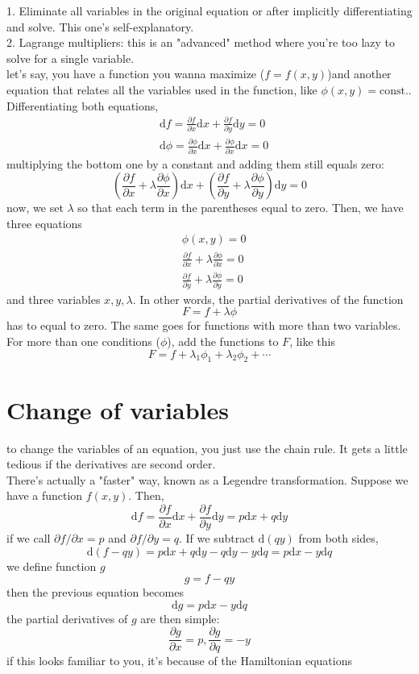 \documentclass[oneside]{book}
\numberwithin{equation}{chapter} %
\begin{document}
1. Eliminate all variables in the original equation or after implicitly differentiating and solve. This one's self-explanatory. \\

2. Lagrange multipliers: this is an "advanced" method where you're too lazy to solve for a single variable. \\
let's say, you have a function you wanna maximize ($f=f(x,y)$)and another equation that relates all the variables used in the function, like $\phi(x,y)=\text{const.}$. Differentiating both equations, 
\begin{align*}
	&\mathrm df=\frac{\partial f}{\partial x}\mathrm dx+\frac{\partial f}{\partial y}\mathrm dy=0\\
	&\mathrm d\phi=\frac{\partial\phi }{\partial x}\mathrm dx+\frac{\partial \phi}{\partial x}\mathrm dx=0
\end{align*}
multiplying the bottom one by a constant and adding them still equals zero:
$$
\left(\frac{\partial f}{\partial x}+\lambda \frac{\partial\phi }{\partial x}\right)\mathrm dx+\left(\frac{\partial f}{\partial y}+\lambda \frac{\partial\phi }{\partial y}\right)\mathrm dy=0
$$
now, we set $\lambda$ so that each term in the parentheses equal to zero. Then, we have three equations 
\begin{align*}
	&\phi(x,y)=0\\
	&\frac{\partial f}{\partial x}+\lambda \frac{\partial\phi }{\partial x}=0\\
	&\frac{\partial f}{\partial y}+\lambda \frac{\partial\phi }{\partial y}=0
\end{align*}
and three variables $x,y,\lambda$. In other words, the partial derivatives of the function 
$$F=f+\lambda\phi$$
has to equal to zero. The same goes for functions with more than two variables. For more than one conditions ($\phi$), add the functions to $F$, like this
$$F=f+\lambda_1\phi_1+\lambda_2\phi_2+\cdots$$
\section{Change of variables}
to change the variables of an equation, you just use the chain rule. It gets a little tedious if the derivatives are second order. \\

There's actually a "faster" way, known as a Legendre transformation. Suppose we have a function $f(x,y)$. Then, 
$$\mathrm df=\frac{\partial f}{\partial x}\mathrm dx+\frac{\partial f}{\partial y}\mathrm dy=p\mathrm dx+q\mathrm dy$$
if we call $\partial f/\partial x=p$ and $\partial f/\partial y=q$. If we subtract $\mathrm d(qy)$ from both sides,
$$\mathrm d(f-qy)=p\mathrm dx+q\mathrm dy-q\mathrm dy-y\mathrm dq=p\mathrm dx-y\mathrm dq$$
we define function $g$ 
$$g=f-qy$$
then the previous equation becomes 
$$\mathrm dg=p\mathrm dx-y\mathrm dq$$
the partial derivatives of $g$ are then simple:
$$\frac{\partial g}{\partial x}=p,\frac{\partial g}{\partial q}=-y$$
if this looks familiar to you, it's because of the Hamiltonian equations
\end{document}
